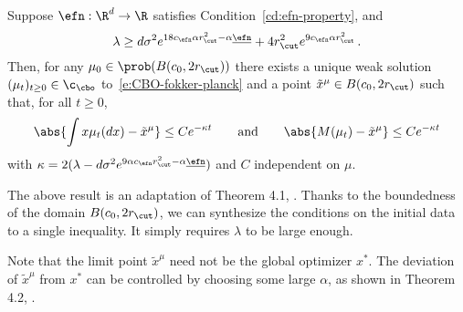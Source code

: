 \documentclass{amsart}
\begin{document}
\begin{proposition}
	\label{pp:CBO-mf-decay}
	Suppose $\efn: \R^d \to \R$ satisfies Condition~\ref{cd:efn-property}, and 
    \begin{equation*}
        \lambda \ge d \sigma^2 e^{18c_\efn \alpha r_\cut^2 - \alpha \underline{\efn}} + 4r_\cut^2 e^{9c_\efn \alpha r_\cut^2} \,.
    \end{equation*}
    Then, for any $\mu_0 \in \prob(B(c_0,2r_\cut))$ there exists a unique weak solution $(\mu_t)_{t \ge 0} \in \c_\cbo$ to~\eqref{e:CBO-fokker-planck} and a point $\tilde x^\mu \in B(c_0, 2r_\cut)$ such that, for all $t \ge 0$,
	\begin{equation*}
		\abs{\int x \mu_t(dx) - \tilde x^\mu} \le C e^{-\kappa t}  \qquad \text{and} \qquad \abs{M(\mu_t) - \tilde x^\mu} \le C e^{-\kappa t}
	\end{equation*}
	with $\kappa = 2(\lambda - d\sigma^2 e^{9\alpha c_\efn r_\cut^2 - \alpha \underline{\efn}} )$ and $C$ independent on $\mu$.
\end{proposition}
\begin{remark}
    The above result is an adaptation of Theorem 4.1, \cite{CarriloChoiTotzeckTse2018}.
    Thanks to the boundedness of the domain $B(c_0, 2r_\cut)$, we can synthesize the conditions on the initial data to a single inequality. 
    It simply requires $\lambda$ to be large enough.
	
    Note that the limit point $\tilde x^\mu$ need not be the global optimizer $x^\ast$. 
    The deviation of $\tilde x^\mu$ from $x^\ast$ can be controlled by choosing some large $\alpha$, as shown in Theorem 4.2, \cite{CarriloChoiTotzeckTse2018}.
\end{remark}
\end{document}
